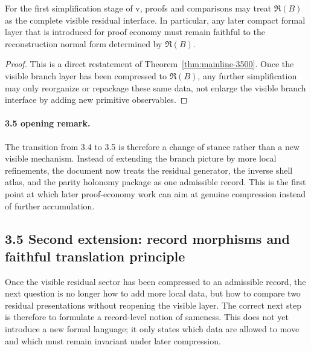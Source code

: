 \begin{corollary}
\label{cor:mainline-3500}
For the first simplification stage of v\docversion, proofs and comparisons may treat $\mathfrak R(B)$ as the complete visible residual interface. In particular, any later compact formal layer that is introduced for proof economy must remain faithful to the reconstruction normal form determined by $\mathfrak R(B)$.
\end{corollary}

\begin{proof}
This is a direct restatement of Theorem~\ref{thm:mainline-3500}. Once the visible branch layer has been compressed to $\mathfrak R(B)$, any further simplification may only reorganize or repackage these same data, not enlarge the visible branch interface by adding new primitive observables.
\end{proof}

\paragraph{3.5 opening remark.}
The transition from 3.4 to 3.5 is therefore a change of stance rather than a new visible mechanism. Instead of extending the branch picture by more local refinements, the document now treats the residual generator, the inverse shell atlas, and the parity holonomy package as one admissible record. This is the first point at which later proof-economy work can aim at genuine compression instead of further accumulation.

\subsection*{3.5 Second extension: record morphisms and faithful translation principle}
Once the visible residual sector has been compressed to an admissible record, the next question is no longer how to add more local data, but how to compare two residual presentations without reopening the visible layer. The correct next step is therefore to formulate a record-level notion of sameness. This does not yet introduce a new formal language; it only states which data are allowed to move and which must remain invariant under later compression.

